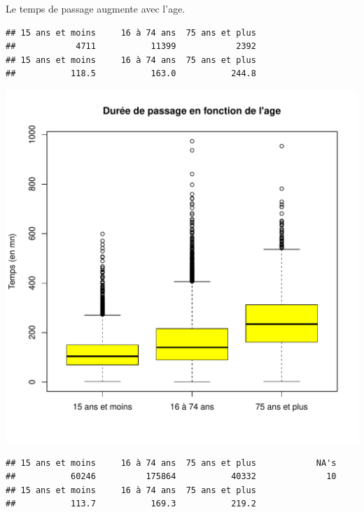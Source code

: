 \documentclass[12pt,english,french,twoside]{report}\usepackage[]{graphicx}\usepackage[]{color}
\makeatletter
\def\maxwidth{ %
  \ifdim\Gin@nat@width>\linewidth
    \linewidth
  \else
    \Gin@nat@width
  \fi
}
\newenvironment{kframe}{%
 \def\at@end@of@kframe{}%
 \ifinner\ifhmode%
  \def\at@end@of@kframe{\end{minipage}}%
  \begin{minipage}{\columnwidth}%
 \fi\fi%
 \def\FrameCommand##1{\hskip\@totalleftmargin \hskip-\fboxsep
 \colorbox{shadecolor}{##1}\hskip-\fboxsep
     \hskip-\linewidth \hskip-\@totalleftmargin \hskip\columnwidth}%
 \MakeFramed {\advance\hsize-\width
   \@totalleftmargin\z@ \linewidth\hsize
   \@setminipage}}%
 {\par\unskip\endMakeFramed%
 \at@end@of@kframe}
\newenvironment{knitrout}{}{} %
\makeatother
\begin{document}
Le temps de passage augmente avec l'age.
\begin{knitrout}
\color{fgcolor}\begin{kframe}
\begin{verbatim}
## 15 ans et moins     16 à 74 ans  75 ans et plus 
##            4711           11399            2392
## 15 ans et moins     16 à 74 ans  75 ans et plus 
##           118.5           163.0           244.8
\end{verbatim}
\end{kframe}
\includegraphics[width=\maxwidth]{figure/duree_age1} 
\begin{kframe}\begin{verbatim}
## 15 ans et moins     16 à 74 ans  75 ans et plus            NA's 
##           60246          175864           40332              10
## 15 ans et moins     16 à 74 ans  75 ans et plus 
##           113.7           169.3           219.2
\end{verbatim}
\end{kframe}

\end{knitrout}
\end{document}

